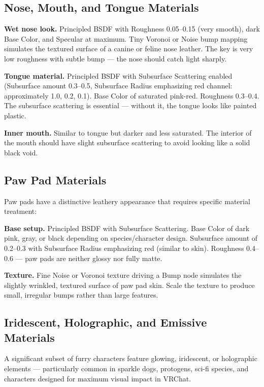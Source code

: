 \subsection{Nose, Mouth, and Tongue Materials}

\textbf{Wet nose look.} Principled BSDF with Roughness 0.05--0.15 (very smooth), dark Base Color, and Specular at maximum. Tiny Voronoi or Noise bump mapping simulates the textured surface of a canine or feline nose leather. The key is very low roughness with subtle bump --- the nose should catch light sharply.

\textbf{Tongue material.} Principled BSDF with Subsurface Scattering enabled (Subsurface amount 0.3--0.5, Subsurface Radius emphasizing red channel: approximately 1.0, 0.2, 0.1). Base Color of saturated pink-red. Roughness 0.3--0.4. The subsurface scattering is essential --- without it, the tongue looks like painted plastic.

\textbf{Inner mouth.} Similar to tongue but darker and less saturated. The interior of the mouth should have slight subsurface scattering to avoid looking like a solid black void.


\subsection{Paw Pad Materials}

Paw pads have a distinctive leathery appearance that requires specific material treatment:

\textbf{Base setup.} Principled BSDF with Subsurface Scattering. Base Color of dark pink, gray, or black depending on species/character design. Subsurface amount of 0.2--0.3 with Subsurface Radius emphasizing red (similar to skin). Roughness 0.4--0.6 --- paw pads are neither glossy nor fully matte.

\textbf{Texture.} Fine Noise or Voronoi texture driving a Bump node simulates the slightly wrinkled, textured surface of paw pad skin. Scale the texture to produce small, irregular bumps rather than large features.


\subsection{Iridescent, Holographic, and Emissive Materials}
\label{subsec:special-materials}

A significant subset of furry characters feature glowing, iridescent, or holographic elements --- particularly common in sparkle dogs, protogens, sci-fi species, and characters designed for maximum visual impact in VRChat.

